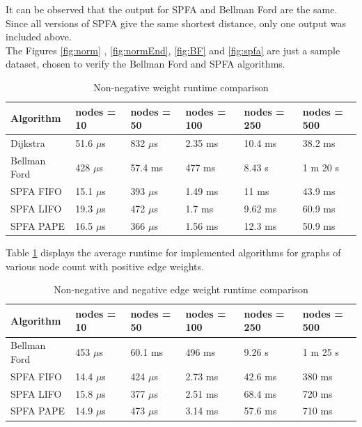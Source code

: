 \documentclass[12pt]{article}
\begin{document}
It can be observed that the output for SPFA and Bellman Ford are the same. Since all versions of SPFA give the same shortest distance, only one output was included above. \\

The Figures \ref{fig:norm} , \ref{fig:normEnd}, \ref{fig:BF} and \ref{fig:spfa} are just a sample dataset, chosen to verify the Bellman Ford and SPFA algorithms. \\
\begin{table}[h]
\begin{center}
	\begin{tabular}{ | m{7em} | m{6em} | m{6em} | m{6em} | m{6em} | m{6em} |}
	\hline
	Algorithm & nodes = 10 & nodes = 50 & nodes = 100 & nodes = 250 &  nodes = 500 \\ \hline
	
	Dijkstra & 51.6 $\mu$s & 832 $\mu$s & 2.35 ms & 10.4 ms & 38.2 ms \\
	\hline
	
	Bellman Ford & 428 $\mu$s & 57.4 ms & 477 ms & 8.43 s & 1 m 20 s \\
	\hline
	
	SPFA FIFO & 15.1 $\mu$s & 393 $\mu$s & 1.49 ms & 11 ms & 43.9 ms \\
	\hline
	
	SPFA LIFO & 19.3 $\mu$s & 472 $\mu$s & 1.7 ms & 9.62 ms & 60.9 ms \\
	\hline
	
	SPFA PAPE & 16.5 $\mu$s & 366 $\mu$s & 1.56 ms & 12.3 ms & 50.9 ms \\
	\hline
	\end{tabular}
	\caption{Non-negative weight runtime comparison}
	\label{table: time1}
\end{center}
\end{table}

Table \ref{table: time1} displays the average runtime for implemented algorithms for graphs of various node count with positive edge weights.  

\begin{table}[h]
\begin{center}
	\begin{tabular}{ | m{7em} | m{6em} | m{6em} | m{6em} | m{6em} | m{6em} |}
	\hline
	Algorithm & nodes = 10 & nodes = 50 & nodes = 100 & nodes = 250 &  nodes = 500 \\ \hline
	
	Bellman Ford & 453 $\mu$s & 60.1 ms & 496 ms & 9.26 s & 1 m 25 s \\
	\hline
	
	SPFA FIFO & 14.4 $\mu$s & 424 $\mu$s & 2.73 ms & 42.6 ms & 380 ms \\
	\hline
	
	SPFA LIFO & 15.8 $\mu$s & 377 $\mu$s & 2.51 ms & 68.4 ms & 720 ms \\
	\hline
	
	SPFA PAPE & 14.9 $\mu$s & 473 $\mu$s & 3.14 ms & 57.6 ms & 710 ms \\
	\hline
	\end{tabular}
	\caption{Non-negative and negative edge weight runtime comparison}
	\label{table: time2}
\end{center}
\end{table}
\end{document}
